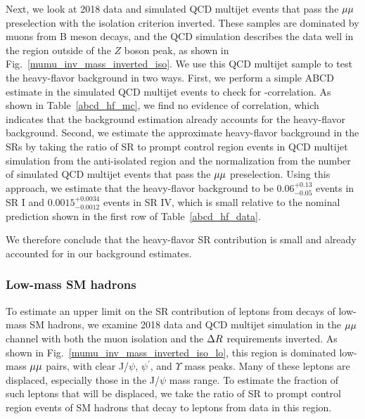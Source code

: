 Next, we look at 2018 data and simulated QCD multijet events that pass the ${\mu}{\mu}$ preselection with the isolation criterion inverted. These samples are dominated by muons from B meson decays, and the QCD simulation describes the data well in the region outside of the $Z$ boson peak, as shown in Fig.~\ref{mumu_inv_mass_inverted_iso}. We use this QCD multijet sample to test the heavy-flavor background in two ways. First, we perform a simple ABCD estimate in the simulated QCD multijet events to check for \ada-\adb correlation. As shown in Table~\ref{abcd_hf_mc}, we find no evidence of correlation, which indicates that the background estimation already accounts for the heavy-flavor background. Second, we estimate the approximate heavy-flavor background in the SRs by taking the ratio of SR to prompt control region events in QCD multijet simulation from the anti-isolated region and the normalization from the number of simulated QCD multijet events that pass the ${\mu}{\mu}$ preselection. Using this approach, we estimate that the heavy-flavor background to be $0.06^{+0.13}_{-0.05}$ events in SR I and $0.0015^{+0.0034}_{-0.0012}$ events in SR IV, which is small relative to the nominal prediction shown in the first row of Table~\ref{abcd_hf_data}.




We therefore conclude that the heavy-flavor SR contribution is small and already accounted for in our background estimates.

\subsubsection{Low-mass SM hadrons}
To estimate an upper limit on the SR contribution of leptons from decays of low-mass SM hadrons, we examine 2018 data and QCD multijet simulation in the ${\mu}{\mu}$ channel with both the muon isolation and the $\Delta R$ requirements inverted. As shown in Fig.~\ref{mumu_inv_mass_inverted_iso_lo}, this region is dominated low-mass ${\mu}{\mu}$ pairs, with clear J/$\psi$, $\psi^\prime$, and $\Upsilon$ mass peaks. Many of these leptons are displaced, especially those in the J/$\psi$ mass range. To estimate the fraction of such leptons that will be displaced, we take the ratio of SR to prompt control region events of SM hadrons that decay to leptons from data in this region.



